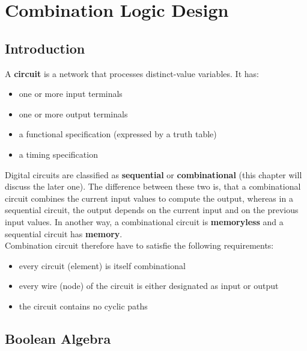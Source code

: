 \chapter{Combination Logic Design}

\section{Introduction}
A \textbf{circuit} is a network that processes distinct-value variables. It has:
\begin{itemize}
    \item one or more input terminals
    \item one or more output terminals
    \item a functional specification (expressed by a truth table)
    \item a timing specification
\end{itemize}
Digital circuits are classified as \textbf{sequential} or \textbf{combinational} (this chapter will discuss the later one). The difference
between these two is, that a combinational circuit combines the current input values to compute the output, whereas in a sequential circuit,
the output depends on the current input and on the previous input values. In another way, a combinational circuit is \textbf{memoryless} and 
a sequential circuit has \textbf{memory}. \\

Combination circuit therefore have to satisfie the following requirements:
\begin{itemize}
    \item every circuit (element) is itself combinational
    \item every wire (node) of the circuit is either designated as input or output
    \item the circuit contains no cyclic paths
\end{itemize}

\section{Boolean Algebra}

